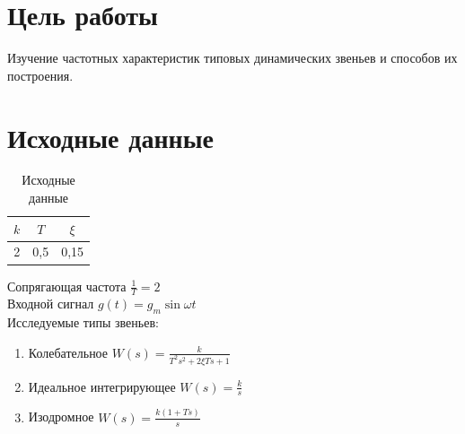 \documentclass[a4paper, 11pt, russian]{article}
\begin{document}
    
    \section*{Цель работы}
    Изучение частотных характеристик типовых динамических звеньев и способов их построения.
    \section*{Исходные данные}
    \begin{table}[h!]
        \flushleft
        \caption{Исходные данные}
        \begin{tabular}{|c|c|c|}
        	\hline
            $k$ & $T$ & $\xi$ \\
            \hline
            2 & 0,5 & 0,15 \\
            \hline
        \end{tabular}
    \end{table}
    \flushleft 
    Сопрягающая частота $\displaystyle{\frac{1}{T}} = 2$\\
    Входной сигнал $g(t) = g_m\sin{\omega t}$\\
    Исследуемые типы звеньев:
    \begin{enumerate}
    	\item Колебательное $W(s) = \displaystyle{\frac{k}{T^2s^2 + 2\xi Ts + 1}}$
        \item Идеальное интегрирующее $W(s) = \displaystyle{\frac{k}{s}}$
        \item Изодромное $W(s) = \displaystyle{\frac{k(1 + Ts)}{s}}$
    \end{enumerate}    
    \clearpage
\end{document}
